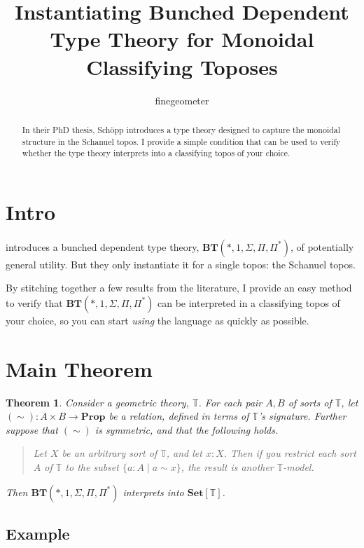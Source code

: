 \documentclass{article}
\title{Instantiating Bunched Dependent Type Theory for Monoidal Classifying Toposes}
\author{finegeometer}
\newtheorem{theorem}{Theorem}[section]
\newcommand*{\Prop}{\mathbf{Prop}}
\newcommand*{\Set}{\mathbf{Set}}
\newcommand*{\T}{\mathbb{T}}
\begin{document}
\maketitle

\begin{abstract}
    In their PhD thesis, Sch\"opp introduces a type theory designed to capture the monoidal structure in the Schanuel topos.
    I provide a simple condition that can be used to verify whether the type theory interprets into a classifying topos of your choice.
\end{abstract}

\section{Intro}

\cite{schopp} introduces a bunched dependent type theory, \(\mathbf{BT}(*, 1, \Sigma, \Pi, \Pi^*)\),
of potentially general utility. But they only instantiate it for a single topos: the Schanuel topos.

By stitching together a few results from the literature,
I provide an easy method to verify that \(\mathbf{BT}(*, 1, \Sigma, \Pi, \Pi^*)\)
can be interpreted in a classifying topos of your choice,
so you can start \emph{using} the language as quickly as possible.

\section{Main Theorem}

\begin{theorem}
    Consider a geometric theory, \(\T\).
    For each pair \(A,B\) of sorts of \(\T\), let \((\sim) : A \times B \to \Prop\) be a relation, defined in terms of \(\T\)'s signature.
    Further suppose that \((\sim)\) is symmetric, and that the following holds.

    \begin{quote}
        Let \(X\) be an arbitrary sort of \(\T\), and let \(x : X\).
        Then if you restrict each sort \(A\) of \(\T\) to the subset \(\{a : A \mid a \sim x\}\),
        the result is another \(\T\)-model.
    \end{quote}

    \noindent Then \(\mathbf{BT}(*, 1, \Sigma, \Pi, \Pi^*)\) interprets into \(\Set[\T]\).
\end{theorem}

\subsection{Example}
\end{document}
